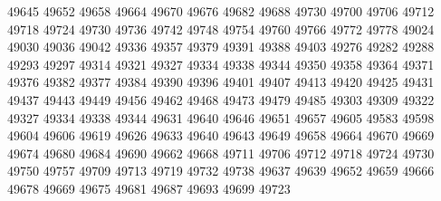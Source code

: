 49645
49652
49658
49664
49670
49676
49682
49688
49730
49700
49706
49712
49718
49724
49730
49736
49742
49748
49754
49760
49766
49772
49778
49024
49030
49036
49042
49336
49357
49379
49391
49388
49403
49276
49282
49288
49293
49297
49314
49321
49327
49334
49338
49344
49350
49358
49364
49371
49376
49382
49377
49384
49390
49396
49401
49407
49413
49420
49425
49431
49437
49443
49449
49456
49462
49468
49473
49479
49485
49303
49309
49322
49327
49334
49338
49344
49631
49640
49646
49651
49657
49605
49583
49598
49604
49606
49619
49626
49633
49640
49643
49649
49658
49664
49670
49669
49674
49680
49684
49690
49662
49668
49711
49706
49712
49718
49724
49730
49750
49757
49709
49713
49719
49732
49738
49637
49639
49652
49659
49666
49678
49669
49675
49681
49687
49693
49699
49723
